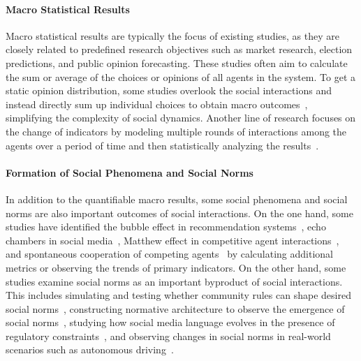 \paragraph{Macro Statistical Results}
Macro statistical results are typically the focus of existing studies, as they are closely related to predefined research objectives such as market research, election predictions, and public opinion forecasting. These studies often aim to calculate the sum or average of the choices or opinions of all agents in the system. To get a static opinion distribution, some studies overlook the social interactions and instead directly sum up individual choices to obtain macro outcomes~\cite{sun2024randomsiliconsamplingsimulating,zhang2024electionsim}, simplifying the complexity of social dynamics. Another line of research focuses on the change of indicators by modeling multiple rounds of interactions among the agents over a period of time and then statistically analyzing the results~\cite{gao2023s3,tornberg2023simulating,han2023guinea,li2024econagent,wu2024shall}.


\paragraph{Formation of Social Phenomena and Social Norms}
In addition to the quantifiable macro results, some social phenomena and social norms are also important outcomes of social interactions. On the one hand, some studies have identified the bubble effect in recommendation systems~\cite{Zhang2024on}, echo chambers in social media~\cite{mou2024unveiling,yang2024oasis,wang2024decoding},  Matthew effect in competitive agent interactions~\cite{zhaocompeteai}, and spontaneous cooperation of competing agents~\cite{wu2024shall} by calculating additional metrics or observing the trends of primary indicators. On the other hand, some studies examine social norms as an important byproduct of social interactions. This includes simulating and testing whether community rules can shape desired social norms~\cite{park2022social}, constructing normative architecture to observe the emergence of social norms~\cite{ren2024emergence}, studying how social media language evolves in the presence of regulatory constraints~\cite{cai2024language}, and observing changes in social norms in real-world scenarios such as autonomous driving~\cite{wang2024can}.









